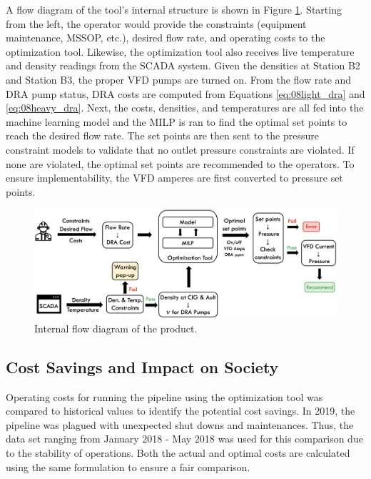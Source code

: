 A flow diagram of the tool's internal structure is shown in Figure \ref{fig:08Product_Flow}. Starting from the left, the operator would provide the constraints (equipment maintenance, MSSOP, etc.), desired flow rate, and operating costs to the optimization tool.  Likewise, the optimization tool also receives live temperature and density readings from the SCADA system.  Given the densities at Station B2 and Station B3, the proper VFD pumps are turned on.  From the flow rate and DRA pump status, DRA costs are computed from Equations \ref{eq:08light_dra} and \ref{eq:08heavy_dra}.  Next, the costs, densities, and temperatures are all fed into the machine learning model and the MILP is ran to find the optimal set points to reach the desired flow rate. The set points are then sent to the pressure constraint models to validate that no outlet pressure constraints are violated.  If none are violated, the optimal set points are recommended to the operators. To ensure implementability, the VFD amperes are first converted to pressure set points.

\begin{figure}[h]
    \centering
    \includegraphics[width=\textwidth]{images/suncor/08Product_Flow.png}
    \caption{Internal flow diagram of the product.}
    \label{fig:08Product_Flow}
\end{figure}

\subsection{Cost Savings and Impact on Society}
Operating costs for running the pipeline using the optimization tool was compared to historical values to identify the potential cost savings.  In 2019, the pipeline was plagued with unexpected shut downs and maintenances. Thus, the data set ranging from January 2018 - May 2018 was used for this comparison due to the stability of operations. Both the actual and optimal costs are calculated using the same formulation to ensure a fair comparison.  

